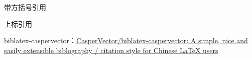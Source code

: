 \documentclass{ctexart}
\begin{document}

    带方括号引用\parencite{3-2}

    上标引用\supercite{6-1}

    \nocite{*}
    \printbibliography[title = 文献] %

    biblatex-caspervector：\href{https://github.com/CasperVector/biblatex-caspervector}{CasperVector/biblatex-caspervector: A simple, nice and easily extensible biblography / citation style for Chinese LaTeX users}
\end{document}
